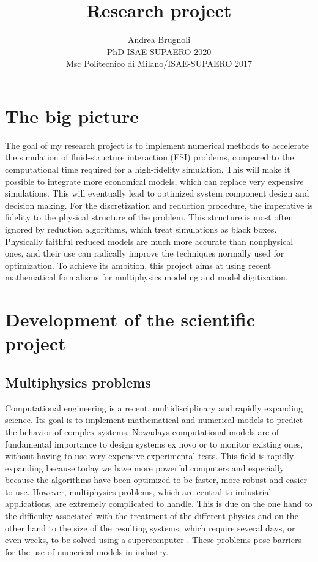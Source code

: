 \documentclass[12pt]{article}
\author{Andrea Brugnoli \\ 
	PhD ISAE-SUPAERO 2020\\
	Msc Politecnico di Milano/ISAE-SUPAERO 2017}
\title{Research project}
\date{}
\begin{document}
	
	\maketitle
	
	\tableofcontents

	
	
	\section{The big picture}
	
	The goal of my research project is to implement numerical methods to accelerate the simulation of fluid-structure interaction (FSI) problems, compared to the computational time required for a high-fidelity simulation. This will make it possible to integrate more economical models, which can replace very expensive simulations. This will eventually lead to optimized system component design and decision making. For the discretization and reduction procedure, the imperative is fidelity to the physical structure of the problem.  This structure is most often ignored by reduction algorithms, which treat simulations as black boxes. Physically faithful reduced models are much more accurate than nonphysical ones, and their use can radically improve the techniques normally used for optimization. To achieve its ambition, this project aims at using recent mathematical formalisms for multiphysics modeling and model digitization.
	
	
	\section{Development of the scientific project}
	
	\subsection{Multiphysics problems}
	Computational engineering is a recent, multidisciplinary and rapidly expanding science. Its goal is to implement mathematical and numerical models to predict the behavior of complex systems. Nowadays computational models are of fundamental importance to design systems ex novo or to monitor existing ones, without having to use very expensive experimental tests. This field is rapidly expanding because today we have more powerful computers and especially because the algorithms have been optimized to be faster, more robust and easier to use. However, multiphysics problems, which are central to industrial applications, are extremely complicated to handle. This is due on the one hand to the difficulty associated with the treatment of the different physics and on the other hand to the size of the resulting systems, which require several days, or even weeks, to be solved using a supercomputer \cite{keyes2013}. These problems pose barriers for the use of numerical models in industry. 
	
\end{document}

